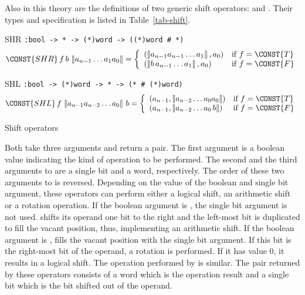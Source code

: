 Also in this theory are the definitions of two generic shift operators:
 and . Their types and specification is listed
in Table~\ref{tab-shift}.
\begin{table}
\begin{center}
\begin{constants}
\item[SHR]\verb":bool -> * -> (*)word -> ((*)word # *)"\newline
\[
\CONST{SHR}\, f\,b\,\nword{a_{n-1}\ldots a_1 a_0} =
  \left\{ \begin{array}{ll}
        (\nword{a_{n-1} a_{n-1}\ldots a_1}, a_0) & \mbox{if $f = \CONST{T}$} \\
        (\nword{b\,a_{n-1}\ldots a_1}, a_0) & \mbox{if $f = \CONST{F}$} \\
        \end{array}
        \right.
\]
\item[SHL]\verb":bool -> (*)word -> * -> (* # (*)word)"\newline
\[
\CONST{SHL}\, f\,\nword{a_{n-1}a_{n-2}\ldots a_0} \,b =
  \left\{ \begin{array}{ll}
        (a_{n-1}, \nword{a_{n-2}\ldots a_0 a_0}) & \mbox{if $f = \CONST{T}$} \\
        (a_{n-1}, \nword{a_{n-2}\ldots a_0\,b}) & \mbox{if $f = \CONST{F}$} \\
        \end{array}
        \right.
\]
\end{constants}
\end{center}
\caption{Shift operators\label{tab-shift}}
\end{table}
Both take three arguments and return a
pair. The first argument is a boolean value indicating the kind of
operation to be performed. The second and the third arguments to
 are a single bit and a word, respectively. The order of
these two arguments to  is reversed. Depending on the value
of the boolean and single bit argument, these operators can perform
either a logical shift, an arithmetic shift or a rotation operation.
If the boolean argument is , the single bit argument is not
used.  shifts its operand one bit to the right and the
left-most bit is duplicated to fill the vacant position, thus,
implementing an arithmetic shift. If the boolean argument is
,  fills the vacant position with the single bit
argument. If this bit is the right-most bit of the operand, a
rotation is performed. If it has value 0, it results in a logical
shift. The operation performed by  is similar. The pair
returned by these operators consists of a word which
is the operation result and a single bit which is the bit shifted out
of the operand.

